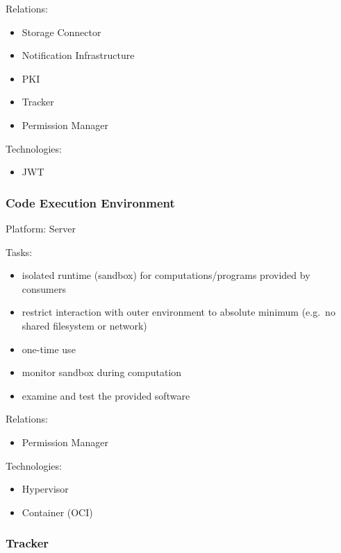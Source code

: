 \documentclass[12pt,english,a4paper,titlepage,cleardoublepage=empty,dottedtoc]{report}
\providecommand{\tightlist}{%
  \setlength{\itemsep}{0pt}\setlength{\parskip}{0pt}}
\begin{document}
Relations:

\begin{itemize}
\tightlist
\item
  Storage Connector
\item
  Notification Infrastructure
\item
  PKI
\item
  Tracker
\item
  Permission Manager
\end{itemize}

Technologies:

\begin{itemize}
\tightlist
\item
  JWT
\end{itemize}

\subsubsection*{Code Execution
Environment}\label{code-execution-environment}

Platform: Server

Tasks:

\begin{itemize}
\tightlist
\item
  isolated runtime (sandbox) for computations/programs provided by
  consumers
\item
  restrict interaction with outer environment to absolute minimum
  (e.g.~no shared filesystem or network)
\item
  one-time use
\item
  monitor sandbox during computation
\item
  examine and test the provided software
\end{itemize}

Relations:

\begin{itemize}
\tightlist
\item
  Permission Manager
\end{itemize}

Technologies:

\begin{itemize}
\tightlist
\item
  Hypervisor
\item
  Container (OCI)
\end{itemize}

\subsubsection*{Tracker}\label{tracker}
\end{document}
